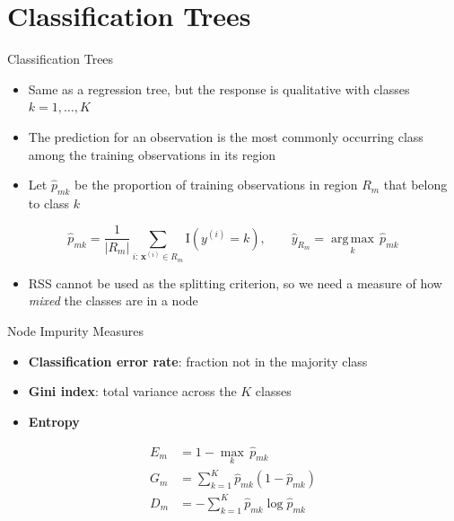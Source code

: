 \section{Classification Trees}


\begin{frame}{Classification Trees}
    \begin{itemize}
        \item Same as a regression tree, but the response is qualitative with classes $k = 1, \dots, K$
        \item The prediction for an observation is the most commonly occurring class among the training observations in its region
        \item Let $\hat{p}_{mk}$ be the proportion of training observations in region $R_m$ that belong to class $k$
    \end{itemize}
    \[
        \hat{p}_{mk} = \frac{1}{|R_m|} \sum_{i:\, \mathbf{x}^{(i)} \in R_m} \mathrm{I}\left( y^{(i)} = k \right), \qquad
        \hat{y}_{R_m} = \operatorname*{arg\,max}_{k}\, \hat{p}_{mk}
    \]
    \begin{itemize}
        \item RSS cannot be used as the splitting criterion, so we need a measure of how \emph{mixed} the classes are in a node
    \end{itemize}
\end{frame}


\begin{frame}{Node Impurity Measures}
    \begin{itemize}
        \item \textbf{Classification error rate}: fraction not in the majority class
        \item \textbf{Gini index}: total variance across the $K$ classes
        \item \textbf{Entropy}
    \end{itemize}
    \begin{align*}
        E_m &= 1 - \max_{k}\, \hat{p}_{mk} \\
        G_m &= \sum_{k=1}^{K} \hat{p}_{mk} \left( 1 - \hat{p}_{mk} \right) \\
        D_m &= - \sum_{k=1}^{K} \hat{p}_{mk} \log \hat{p}_{mk}
    \end{align*}
\end{frame}


